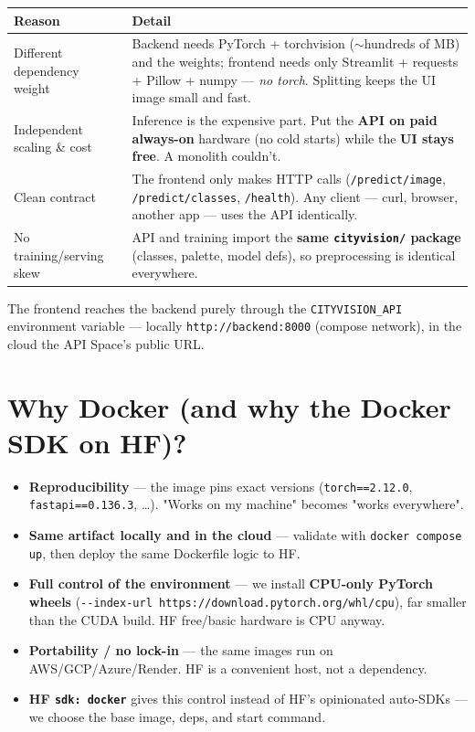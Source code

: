 \documentclass[11pt]{article}
\newcommand{\code}[1]{\lstinline[basicstyle=\ttfamily\normalsize]|#1|}
\begin{document}
\begin{tabularx}{\linewidth}{@{}p{3.2cm}X@{}}
\toprule
\textbf{Reason} & \textbf{Detail} \\
\midrule
Different dependency weight & Backend needs PyTorch + torchvision ($\sim$hundreds of
MB) and the weights; frontend needs only Streamlit + requests + Pillow + numpy ---
\emph{no torch}. Splitting keeps the UI image small and fast. \\
\addlinespace
Independent scaling \& cost & Inference is the expensive part. Put the \textbf{API on
paid always-on} hardware (no cold starts) while the \textbf{UI stays free}. A
monolith couldn't. \\
\addlinespace
Clean contract & The frontend only makes HTTP calls (\code{/predict/image},
\code{/predict/classes}, \code{/health}). Any client --- curl, browser, another app
--- uses the API identically. \\
\addlinespace
No training/serving skew & API and training import the \textbf{same
\code{cityvision/} package} (classes, palette, model defs), so preprocessing is
identical everywhere. \\
\bottomrule
\end{tabularx}

\medskip
The frontend reaches the backend purely through the \code{CITYVISION_API}
environment variable --- locally \code{http://backend:8000} (compose network), in the
cloud the API Space's public URL.

\section{Why Docker (and why the Docker SDK on HF)?}

\begin{itemize}
  \item \textbf{Reproducibility} --- the image pins exact versions
    (\code{torch==2.12.0}, \code{fastapi==0.136.3}, \dots). "Works on my machine"
    becomes "works everywhere".
  \item \textbf{Same artifact locally and in the cloud} --- validate with
    \code{docker compose up}, then deploy the same Dockerfile logic to HF.
  \item \textbf{Full control of the environment} --- we install \textbf{CPU-only
    PyTorch wheels} (\code{--index-url https://download.pytorch.org/whl/cpu}), far
    smaller than the CUDA build. HF free/basic hardware is CPU anyway.
  \item \textbf{Portability / no lock-in} --- the same images run on
    AWS/GCP/Azure/Render. HF is a convenient host, not a dependency.
  \item \textbf{HF \code{sdk: docker}} gives this control instead of HF's opinionated
    auto-SDKs --- we choose the base image, deps, and start command.
\end{itemize}
\end{document}
